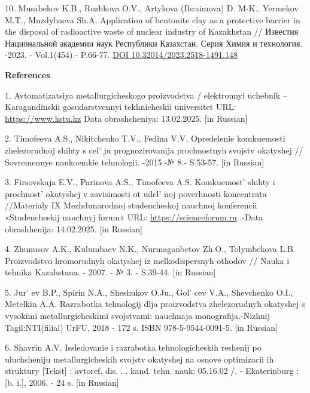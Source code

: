 \begin{references}
10. Musabekov K.B., Rozhkova O.V., Artykova (Ibraimova) D. M-K., Yermekov
M.T., Muzdybaeva Sh.A. Application of bentonite clay as a protective
barrier in the disposal of radioactive waste of nuclear industry of
Kazakhstan // Известия Национальной академии наук Республики Казахстан.
Серия Химия и технология. -2023. - Vol.1(454).- P.66-77.
\href{https://doi.org/10.32014/2023.2518-1491.148}{DOI 10.32014/2023.2518-1491.148}
\end{references}

\begin{center}
{\bfseries References}
\end{center}

\begin{references}
1. Avtomatizatsiya metallurgicheskogo proizvodstva / elektronnyi uchebnik
-- Karagandinskii gosudarstv\-ennyi tekhnicheskii universitet URL:
\href{https://www.kstu.kz/wp-content/uploads/2018/05/tsifrovaya-mitallurgiya/el-uch-po-ampr/index.htm-}{https://www.kstu.kz}
Data obrashcheniya: 13.02.2025. {[}in Russian{]}

2. Timofeeva A.S., Nikitchenko T.V., Fedina V.V. Opredelenie komkuemosti
zhelezorudnoj shihty s cel' ju prognozirovanija
prochnostnyh svojstv okatyshej // Sovremennye naukoemkie tehnologii.
-2015.-№ 8.- S.53-57. {[}in Russian{]}

3. Firsovskaja E.V., Parinova A.S., Timofeeva A.S.
Komkuemost'{} shihty i prochnost'{}
okatyshej v zavis\-imosti ot udel' noj poverhnosti
koncentrata //Materialy IX Mezhdunarodnoj studencheskoj nauchnoj
konf\-erencii «Studencheskij nauchnyj forum» URL:
\href{https://scienceforum.ru/2017/article/2017038139}{https://scienceforum.ru} .-Data obrashhenija:
14.02.2025. {[}in Russian{]}

4. Zhunusov A.K., Kulumbaev N.K., Nurmaganbetov Zh.O., Tolymbekova L.B.
Proizvodstvo hromorudnyh okatyshej iz melkodispersnyh othodov // Nauka i
tehnika Kazahstana. - 2007. - № 3. - S.39-44. {[}in Russian{]}

5. Jur' ev B.P., Spirin N.A., Sheshukov O.Ju.,
Gol' cev V.A., Shevchenko O.I., Metelkin A.A. Razrabotka
tehnologij dlja proizvodstva zhelezorudnyh okatyshej s vysokimi
metallurgicheskimi svojstvami: nauchnaja monografija.-Nizhnij
Tagil:NTI(filial) UrFU, 2018 - 172 s. ISBN 978-5-9544-0091-5. {[}in
Russian{]}

6. Shavrin A.V. Issledovanie i razrabotka tehnologicheskih reshenij po
uluchsheniju metallurgicheskih svojstv okatyshej na osnove optimizacii
ih struktury {[}Tekst{]} : avtoref. dis. ... kand. tehn. nauk: 05.16.02
/. - Ekaterinburg : {[}b. i.{]}, 2006. - 24 s. {[}in Russian{]}


\end{references}
